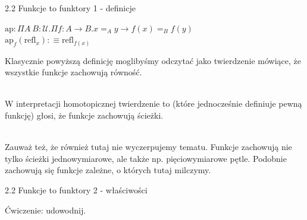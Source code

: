 \documentclass{beamer}
\newcommand{\U}{\mathcal{U}}
\newcommand{\refl}[1]{\text{refl}_{#1}}
\newcommand{\ap}[2]{\text{ap}_{#1}(#2)}
\begin{document}
\begin{frame}{2.2 Funkcje to funktory 1 - definicje}

\begin{definition}

$\text{ap} : \Pi A\ B : \U. \Pi f : A \to B. x =_A y \to f(x) =_B f(y)$ \\
$\ap{f}{\refl{x}} :\equiv \refl{f(x)}$

\end{definition}

Klasycznie powyższą definicję moglibyśmy odczytać jako twierdzenie mówiące, że wszystkie funkcje zachowują równość. \\~\

W interpretacji homotopicznej twierdzenie to (które jednocześnie definiuje pewną funkcję) głosi, że funkcje zachowują ścieżki. \\~\

Zauważ też, że również tutaj nie wyczerpujemy tematu. Funkcje zachowują nie tylko ścieżki jednowymiarowe, ale także np. pięciowymiarowe pętle. Podobnie zachowują się funkcje zależne, o których tutaj milczymy.

\end{frame}

\begin{frame}{2.2 Funkcje to funktory 2 - właściwości}

Ćwiczenie: udowodnij.

\end{frame}
\end{document}
